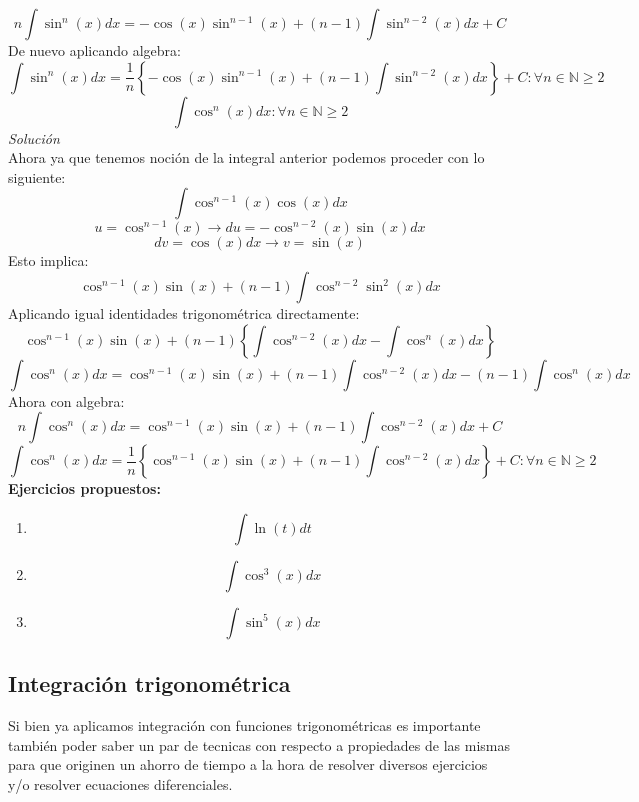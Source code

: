 \documentclass[10pt]{article}
\begin{document}
\[n\int\sin^{n}(x)dx=-\cos(x)\sin^{n-1}(x) + (n-1)\int \sin^{n-2}(x)dx + C\]
De nuevo aplicando algebra:
\[\int\sin^{n}(x)dx=\frac{1}{n}\left\{-\cos(x)\sin^{n-1}(x) + (n-1)\int \sin^{n-2}(x)dx\right\} + C \colon \forall n\in\mathbb{N}\geq 2\]
\vspace{1cm}
\[\int \cos^{n}(x)dx \colon \forall n\in\mathbb{N}\geq 2\]
\textit{Solución}\\
Ahora ya que tenemos noción de la integral anterior podemos proceder con lo siguiente:
\[\int\cos^{n-1}(x)\cos(x)dx\]
\[u=\cos^{n-1}(x)\rightarrow du=-\cos^{n-2}(x)\sin(x)dx\]
\[dv=\cos(x)dx \rightarrow v=\sin(x)\]
Esto implica:
\[\cos^{n-1}(x)\sin(x)+(n-1)\int\cos^{n-2}\sin^{2}(x)dx\]
Aplicando igual identidades trigonométrica directamente:
\[\cos^{n-1}(x)\sin(x)+(n-1)\left\{\int\cos^{n-2}(x)dx - \int\cos^{n}(x)dx\right\}\]
\[\int\cos^{n}(x)dx =\cos^{n-1}(x)\sin(x)+(n-1)\int\cos^{n-2}(x)dx-(n-1)\int\cos^{n}(x)dx\ \]
Ahora con algebra:
\[n\int\cos^{n}(x)dx =\cos^{n-1}(x)\sin(x)+(n-1)\int\cos^{n-2}(x)dx+C\]
\[\int\cos^{n}(x)dx =\frac{1}{n}\left\{\cos^{n-1}(x)\sin(x)+(n-1)\int\cos^{n-2}(x)dx\right\}+C \colon \forall n\in\mathbb{N}\geq 2\]
\textbf{Ejercicios propuestos:}
\begin{enumerate}
  \item \[\int\ln(t)dt\]
  \item \[\int \cos^{3}(x)dx\]
  \item \[\int \sin^{5}(x)dx\]
\end{enumerate}
\clearpage

\subsection{Integración trigonométrica}
Si bien ya aplicamos integración con funciones trigonométricas es importante también poder saber un par de tecnicas con respecto a propiedades de las mismas para que originen un ahorro de tiempo a la hora de resolver diversos ejercicios y/o resolver ecuaciones diferenciales.\\
\end{document}
